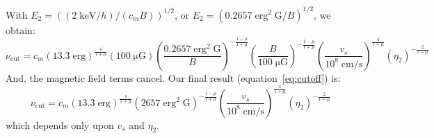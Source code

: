 \documentclass[iop, apj, numberedappendix]{emulateapj}
\newcommand*{\mt}{\mathrm}
\newcommand*{\unit}[1]{\;\mt{#1}}  %
\newcommand*{\muG}{\unit{\mu G}}
\begin{document}
With $E_2 = \left( (2 \unit{keV}/h) / (c_m B) \right)^{1/2}$, or
$E_2 = \left( 0.2657 \unit{erg^2\;G} / B \right)^{1/2}$, we obtain:
\[
    \nu_{\mt{cut}} = c_m
        \left( 13.3 \unit{erg} \right)^{\frac{4}{1+\mu}}
        \left( 100 \muG \right)
        \left( \frac{0.2657 \unit{erg^2\;G}}{B} \right)^{-\frac{1-\mu}{1+\mu}}
        \left( \frac{B}{100\muG} \right)^{-\frac{1-\mu}{1+\mu}}
        \left( \frac{v_s}{10^8 \unit{cm/s}} \right)^{\frac{4}{1+\mu}}
        \left( \eta_2 \right)^{-\frac{2}{1+\mu}}
\]
And, the magnetic field terms cancel.  Our final result
(equation~\eqref{eq:cutoff}) is:
\begin{equation}
    \nu_{\mt{cut}} = c_m
        \left( 13.3 \unit{erg} \right)^{\frac{4}{1+\mu}}
        \left( 2657 \unit{erg^2\;G} \right)^{-\frac{1-\mu}{1+\mu}}
        \left( \frac{v_s}{10^8 \unit{cm/s}} \right)^{\frac{4}{1+\mu}}
        \left( \eta_2 \right)^{-\frac{2}{1+\mu}}
\end{equation}
which depends only upon $v_s$ and $\eta_2$.

\end{document}
